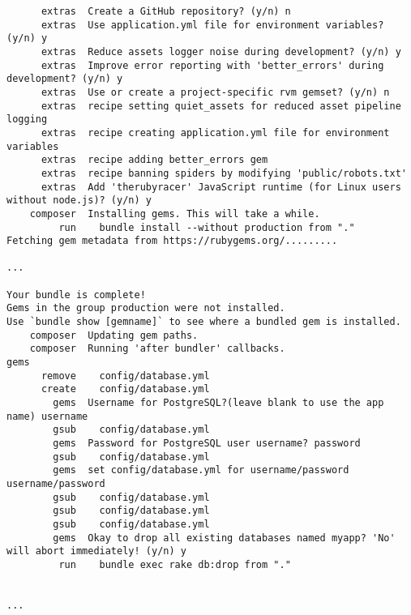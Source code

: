 \documentclass[bidi]{tufte-handout}
\begin{document}
\begin{verbatim}
      extras  Create a GitHub repository? (y/n) n
      extras  Use application.yml file for environment variables? (y/n) y
      extras  Reduce assets logger noise during development? (y/n) y
      extras  Improve error reporting with 'better_errors' during development? (y/n) y
      extras  Use or create a project-specific rvm gemset? (y/n) n
      extras  recipe setting quiet_assets for reduced asset pipeline logging
      extras  recipe creating application.yml file for environment variables
      extras  recipe adding better_errors gem
      extras  recipe banning spiders by modifying 'public/robots.txt'
      extras  Add 'therubyracer' JavaScript runtime (for Linux users without node.js)? (y/n) y
    composer  Installing gems. This will take a while.
         run    bundle install --without production from "."
Fetching gem metadata from https://rubygems.org/.........

...

Your bundle is complete!
Gems in the group production were not installed.
Use `bundle show [gemname]` to see where a bundled gem is installed.
    composer  Updating gem paths.
    composer  Running 'after bundler' callbacks.
gems
      remove    config/database.yml
      create    config/database.yml
        gems  Username for PostgreSQL?(leave blank to use the app name) username
        gsub    config/database.yml
        gems  Password for PostgreSQL user username? password
        gsub    config/database.yml
        gems  set config/database.yml for username/password username/password
        gsub    config/database.yml
        gsub    config/database.yml
        gsub    config/database.yml
        gems  Okay to drop all existing databases named myapp? 'No' will abort immediately! (y/n) y
         run    bundle exec rake db:drop from "."


...


\end{verbatim}


\end{document}
